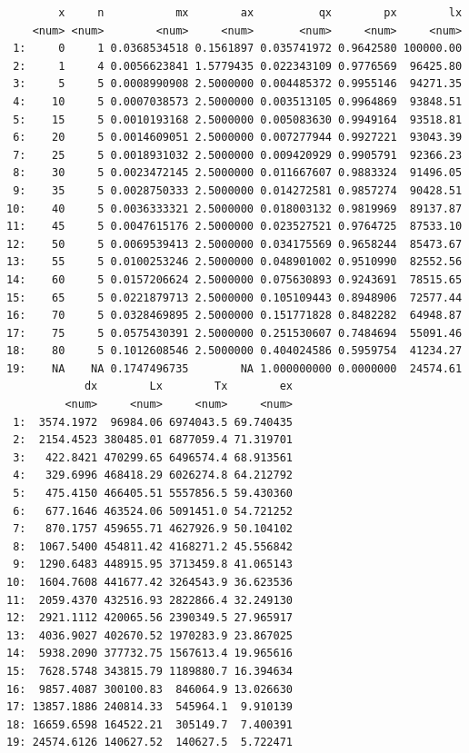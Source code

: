 \documentclass[
  letterpaper,
  DIV=11,
  numbers=noendperiod]{scrartcl}
\begin{document}
\begin{verbatim}
        x     n           mx        ax          qx        px        lx
    <num> <num>        <num>     <num>       <num>     <num>     <num>
 1:     0     1 0.0368534518 0.1561897 0.035741972 0.9642580 100000.00
 2:     1     4 0.0056623841 1.5779435 0.022343109 0.9776569  96425.80
 3:     5     5 0.0008990908 2.5000000 0.004485372 0.9955146  94271.35
 4:    10     5 0.0007038573 2.5000000 0.003513105 0.9964869  93848.51
 5:    15     5 0.0010193168 2.5000000 0.005083630 0.9949164  93518.81
 6:    20     5 0.0014609051 2.5000000 0.007277944 0.9927221  93043.39
 7:    25     5 0.0018931032 2.5000000 0.009420929 0.9905791  92366.23
 8:    30     5 0.0023472145 2.5000000 0.011667607 0.9883324  91496.05
 9:    35     5 0.0028750333 2.5000000 0.014272581 0.9857274  90428.51
10:    40     5 0.0036333321 2.5000000 0.018003132 0.9819969  89137.87
11:    45     5 0.0047615176 2.5000000 0.023527521 0.9764725  87533.10
12:    50     5 0.0069539413 2.5000000 0.034175569 0.9658244  85473.67
13:    55     5 0.0100253246 2.5000000 0.048901002 0.9510990  82552.56
14:    60     5 0.0157206624 2.5000000 0.075630893 0.9243691  78515.65
15:    65     5 0.0221879713 2.5000000 0.105109443 0.8948906  72577.44
16:    70     5 0.0328469895 2.5000000 0.151771828 0.8482282  64948.87
17:    75     5 0.0575430391 2.5000000 0.251530607 0.7484694  55091.46
18:    80     5 0.1012608546 2.5000000 0.404024586 0.5959754  41234.27
19:    NA    NA 0.1747496735        NA 1.000000000 0.0000000  24574.61
            dx        Lx        Tx        ex
         <num>     <num>     <num>     <num>
 1:  3574.1972  96984.06 6974043.5 69.740435
 2:  2154.4523 380485.01 6877059.4 71.319701
 3:   422.8421 470299.65 6496574.4 68.913561
 4:   329.6996 468418.29 6026274.8 64.212792
 5:   475.4150 466405.51 5557856.5 59.430360
 6:   677.1646 463524.06 5091451.0 54.721252
 7:   870.1757 459655.71 4627926.9 50.104102
 8:  1067.5400 454811.42 4168271.2 45.556842
 9:  1290.6483 448915.95 3713459.8 41.065143
10:  1604.7608 441677.42 3264543.9 36.623536
11:  2059.4370 432516.93 2822866.4 32.249130
12:  2921.1112 420065.56 2390349.5 27.965917
13:  4036.9027 402670.52 1970283.9 23.867025
14:  5938.2090 377732.75 1567613.4 19.965616
15:  7628.5748 343815.79 1189880.7 16.394634
16:  9857.4087 300100.83  846064.9 13.026630
17: 13857.1886 240814.33  545964.1  9.910139
18: 16659.6598 164522.21  305149.7  7.400391
19: 24574.6126 140627.52  140627.5  5.722471
\end{verbatim}
\end{document}

